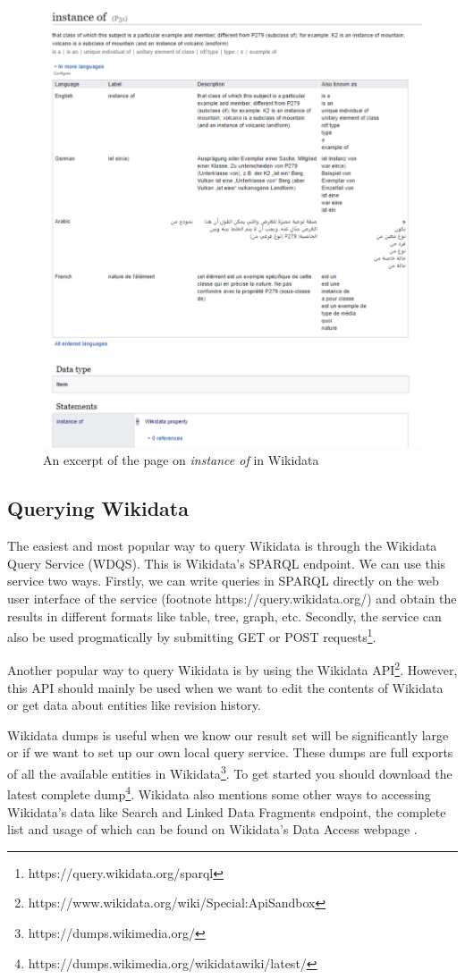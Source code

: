 \begin{figure}[h]
  \centering
  \includegraphics[width=0.75 \linewidth]{images/instance_of.pdf}
  \caption{An excerpt of the page on \textit{instance of} in Wikidata}
  \label{fig:figure 5}
\end{figure}

\subsection{Querying Wikidata}

The easiest and most popular way to query Wikidata is through the Wikidata Query Service (WDQS). This is Wikidata’s SPARQL endpoint. We can use this service two ways. Firstly, we can write queries in SPARQL directly on the web user interface of the service (footnote https://query.wikidata.org/) and obtain the results in different formats like table, tree, graph, etc. Secondly, the service can also be used progmatically by submitting GET or POST requests\footnote{https://query.wikidata.org/sparql}.

Another popular way to query Wikidata is by using the Wikidata API\footnote{https://www.wikidata.org/wiki/Special:ApiSandbox}. However, this API should mainly be used when we want to edit the contents of Wikidata or get data about entities like revision history.

Wikidata dumps is useful when we know our result set will be significantly large or if we want to set up our own local query service. These dumps are full exports of all the available entities in Wikidata\footnote{https://dumps.wikimedia.org/}. To get started you should download the latest complete dump\footnote{https://dumps.wikimedia.org/wikidatawiki/latest/}. Wikidata also mentions some other ways to accessing Wikidata’s data like Search and Linked Data Fragments endpoint, the complete list and usage of which can be found on Wikidata’s Data Access webpage \cite{ Wikidata2022}.


